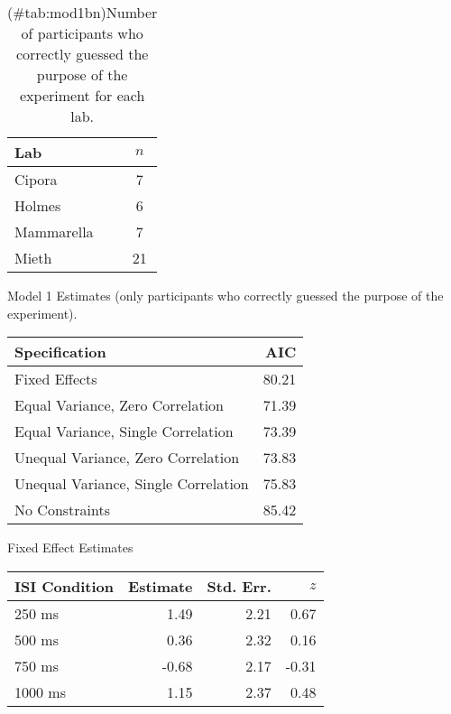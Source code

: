 \begin{appendix}
\begin{table}

\caption{(\#tab:mod1bn)Number of participants who correctly guessed the purpose of the experiment for each lab.}
\centering
\begin{tabular}[t]{lc}
\toprule
Lab & $n$\\
\midrule
Cipora & 7\\
Holmes & 6\\
Mammarella & 7\\
Mieth & 21\\
\bottomrule
\end{tabular}
\end{table}

\begin{table}[!p]
\caption{\label{tab:mod1b}Model 1 Estimates (only participants who correctly guessed the purpose of the experiment).}
\begin{subtable}{\textwidth}
\centering
\begin{table}[H]\centering\begingroup\fontsize{10}{12}\selectfont

\begin{tabular}{lr}
\toprule
Specification & AIC\\
\midrule
Fixed Effects & 80.21\\
Equal Variance, Zero Correlation & 71.39\\
Equal Variance, Single Correlation & 73.39\\
Unequal Variance, Zero Correlation & 73.83\\
Unequal Variance, Single Correlation & 75.83\\
No Constraints & 85.42\\
\bottomrule
\end{tabular}\endgroup{}
\end{table}
\end{subtable}
\begin{subtable}{\textwidth}
\caption{Fixed Effect Estimates}
\centering
\begin{table}[H]\centering\begingroup\fontsize{10}{12}\selectfont

\begin{tabular}{lrrr}
\toprule
ISI Condition & Estimate & Std. Err. & $z$\\
\midrule
250  ms & 1.49 & 2.21 & 0.67\\
500  ms & 0.36 & 2.32 & 0.16\\
750  ms & -0.68 & 2.17 & -0.31\\
1000 ms & 1.15 & 2.37 & 0.48\\
\bottomrule
\end{tabular}\endgroup{}
\end{table}
\end{subtable}
\begin{subtable}{\textwidth}
\caption{Variance Component Estimates. Estimates are presented on the standard deviation scale. }
\centering
\begin{table}[H]\centering\begingroup\fontsize{10}{12}\selectfont


\end{table}
\end{subtable}
\end{table}
\end{appendix}
